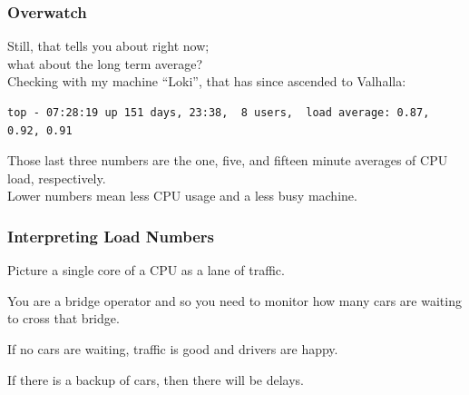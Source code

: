 \begin{frame}[fragile]
\frametitle{Overwatch}


\begin{changemargin}{1cm}
Still, that tells you about right now; \\
what about the long term average? \\[1em]

Checking with my machine ``Loki'', that has since ascended to Valhalla:\\[1em]

{\scriptsize
\begin{verbatim}
top - 07:28:19 up 151 days, 23:38,  8 users,  load average: 0.87, 0.92, 0.91
\end{verbatim}
}

Those last three numbers are the one, five, and fifteen minute averages of CPU load, respectively. \\[1em]

Lower numbers mean less CPU usage and a less busy machine. 
\end{changemargin}

\end{frame}




\begin{frame}
\frametitle{Interpreting Load Numbers}


\begin{changemargin}{1cm}
Picture a single core of a CPU as a lane of traffic. 

You are a bridge operator and so you need to monitor how many cars are waiting to cross that bridge. 

If no cars are waiting, traffic is good and drivers are happy. 

If there is a backup of cars, then there will be delays.
\end{changemargin}

\end{frame}



